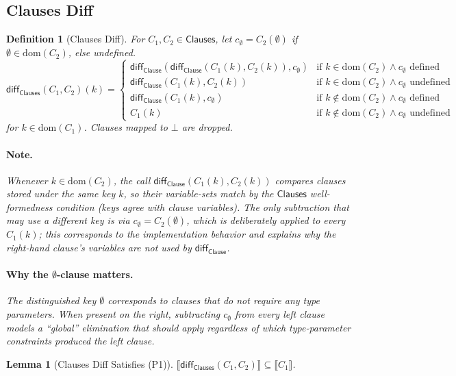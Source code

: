 \documentclass[11pt]{article}
\newtheorem{lemma}[theorem]{Lemma}
\newtheorem{definition}[theorem]{Definition}
\newcommand{\sem}[1]{\llbracket #1 \rrbracket}
\newcommand{\diff}{\mathsf{diff}}
\newcommand{\Clauses}{\mathsf{Clauses}}
\newcommand{\Clause}{\mathsf{Clause}}
\begin{document}
\subsection{Clauses Diff}

\begin{definition}[Clauses Diff]
\label{def:clauses-diff}
For $C_1, C_2 \in \Clauses$, let $c_{\emptyset} = C_2(\emptyset)$ if $\emptyset \in \mathrm{dom}(C_2)$, else undefined.
\[
\diff_{\Clauses}(C_1, C_2)(k) = 
\begin{cases}
\diff_{\Clause}(\diff_{\Clause}(C_1(k), C_2(k)), c_{\emptyset}) & \text{if } k \in \mathrm{dom}(C_2) \land c_{\emptyset} \text{ defined} \\
\diff_{\Clause}(C_1(k), C_2(k)) & \text{if } k \in \mathrm{dom}(C_2) \land c_{\emptyset} \text{ undefined} \\
\diff_{\Clause}(C_1(k), c_{\emptyset}) & \text{if } k \notin \mathrm{dom}(C_2) \land c_{\emptyset} \text{ defined} \\
C_1(k) & \text{if } k \notin \mathrm{dom}(C_2) \land c_{\emptyset} \text{ undefined}
\end{cases}
\]
for $k \in \mathrm{dom}(C_1)$. Clauses mapped to $\bot$ are dropped.
\paragraph{Note.}
Whenever $k \in \mathrm{dom}(C_2)$, the call $\diff_{\Clause}(C_1(k), C_2(k))$ compares clauses stored under the \emph{same key} $k$, so their variable-sets match by the $\Clauses$ well-formedness condition (keys agree with clause variables).
The only subtraction that may use a different key is via $c_{\emptyset}=C_2(\emptyset)$, which is deliberately applied to every $C_1(k)$; this corresponds to the implementation behavior and explains why the right-hand clause's variables are not used by $\diff_{\Clause}$.
\paragraph{Why the $\emptyset$-clause matters.}
The distinguished key $\emptyset$ corresponds to clauses that do not require any type parameters.
When present on the right, subtracting $c_{\emptyset}$ from every left clause models a ``global'' elimination that should apply regardless of which type-parameter constraints produced the left clause.
\end{definition}

\begin{lemma}[Clauses Diff Satisfies (P1)]
\label{lem:clauses-diff-p1}
$\sem{\diff_{\Clauses}(C_1, C_2)} \subseteq \sem{C_1}$.
\end{lemma}
\end{document}
